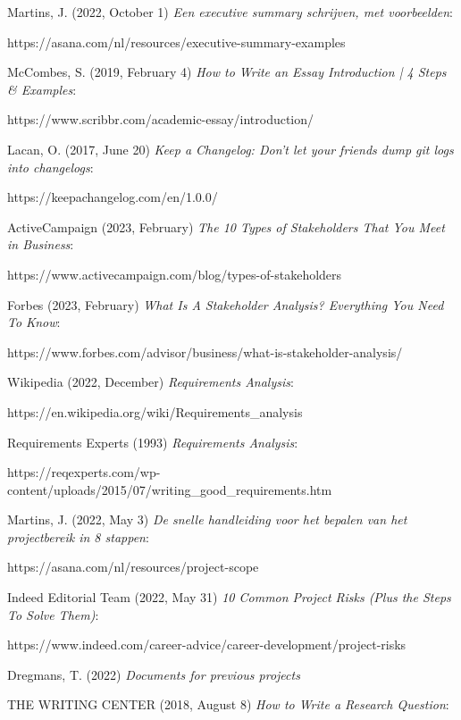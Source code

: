 \documentclass[10pt]{report}
\begin{document}
\begin{thebibliography}{1}
\thispagestyle{fancy}

Martins, J. (2022, October 1) \emph{Een executive summary schrijven, met voorbeelden}:

https://asana.com/nl/resources/executive-summary-examples

McCombes, S. (2019, February 4) \emph{How to Write an Essay Introduction | 4 Steps \& Examples}:

https://www.scribbr.com/academic-essay/introduction/

Lacan, O. (2017, June 20) \emph{Keep a Changelog: Don’t let your friends dump git logs into changelogs}:

https://keepachangelog.com/en/1.0.0/

ActiveCampaign (2023, February) \emph{The 10 Types of Stakeholders That You Meet in Business}:

https://www.activecampaign.com/blog/types-of-stakeholders

Forbes (2023, February) \emph{What Is A Stakeholder Analysis? Everything You Need To Know}:

https://www.forbes.com/advisor/business/what-is-stakeholder-analysis/

Wikipedia (2022, December) \emph{Requirements Analysis}:

https://en.wikipedia.org/wiki/Requirements\_analysis

Requirements Experts (1993) \emph{Requirements Analysis}:

https://reqexperts.com/wp-content/uploads/2015/07/writing\_good\_requirements.htm

Martins, J. (2022, May 3) \emph{De snelle handleiding voor het bepalen van het projectbereik in 8 stappen}:

https://asana.com/nl/resources/project-scope

Indeed Editorial Team (2022, May 31) \emph{10 Common Project Risks (Plus the Steps To Solve Them)}:

https://www.indeed.com/career-advice/career-development/project-risks

Dregmans, T. (2022) \emph{Documents for previous projects}

THE WRITING CENTER (2018, August 8) \emph{How to Write a Research Question}:


\end{thebibliography}
\end{document}
